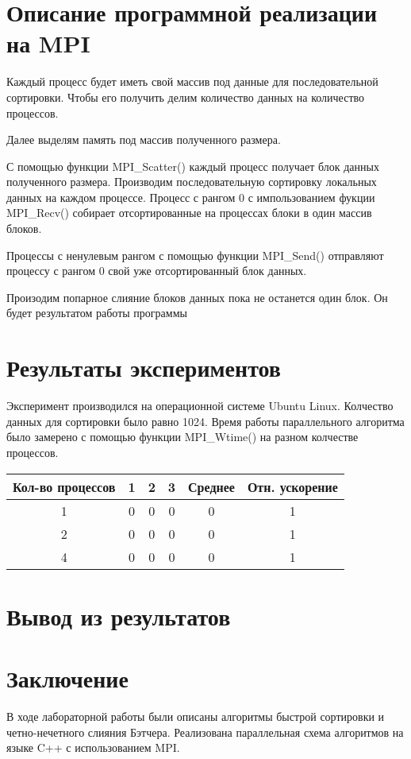 \documentclass[oneside,final,14pt]{extreport}
\begin{document}
\chapter{Описание программной реализации на MPI}

Каждый процесс будет иметь свой массив под данные для последовательной сортировки. Чтобы его получить делим количество данных на количество процессов.
\bigskip

Далее выделям память под массив полученного размера.
\bigskip

С помощью функции MPI\_Scatter() каждый процесс получает блок данных полученного размера.
\bigskip
Производим последовательную сортировку локальных данных на каждом процессе.
\bigskip
Процесс с рангом \(0\) с импользованием фукции MPI\_Recv() собирает отсортированные на процессах блоки в один массив блоков.

Процессы с ненулевым рангом с помощью функции MPI\_Send() отправляют процессу с рангом \(0\) свой уже отсортированный блок данных.
\bigskip

Произодим попарное слияние блоков данных пока не останется один блок. Он будет результатом работы программы

\chapter{Результаты экспериментов}

Эксперимент производился на операционной системе Ubuntu Linux. Колчество данных для сортировки было равно 1024. Время работы параллельного алгоритма было замерено с помощью функции MPI\_Wtime() на разном колчестве процессов.
\begin{center}
    \begin{tabular}{|c||c|c|c||c|c|} \hline
        Кол-во процессов & 1  & 2  & 3  & Среднее & Отн. ускорение \\ \hline \hline
        1 & 0 & 0 & 0 & 0 & 1 \\ \hline
        2 & 0 & 0 & 0 & 0 & 1 \\ \hline
        4 & 0 & 0 & 0 & 0 & 1 \\ \hline
    \end{tabular}   
\end{center}
\chapter{Вывод из результатов}

\chapter{Заключение}
В ходе лабораторной работы были описаны алгоритмы быстрой сортировки и четно-нечетного слияния Бэтчера. Реализована параллельная схема алгоритмов на языке C++ с использованием MPI.
\bigskip
\end{document}

